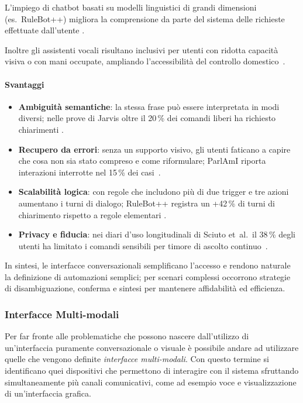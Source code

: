 L’impiego di chatbot basati su modelli linguistici di grandi dimensioni (es.\ RuleBot++) migliora la comprensione da parte del sistema delle richieste effettuate dall'utente \cite{Gallo2024Conversational}.  

Inoltre gli assistenti vocali risultano inclusivi per utenti con ridotta capacità visiva o con mani occupate, ampliando l'accessibilità del controllo domestico~\cite{Sciuto2018}.

\paragraph{Svantaggi} 
\begin{itemize}
  \item \textbf{Ambiguità semantiche}: la stessa frase può essere interpretata in modi diversi; nelle prove di Jarvis oltre il 20\,\% dei comandi liberi ha richiesto chiarimenti \cite{Lago2021}.
  \item \textbf{Recupero da errori}: senza un supporto visivo, gli utenti faticano a capire che cosa non sia stato compreso e come riformulare; ParlAmI riporta interazioni interrotte nel 15\,\% dei casi~\cite{ParlAmi2019}.
  \item \textbf{Scalabilità logica}: con regole che includono più di due trigger e tre azioni aumentano i turni di dialogo; RuleBot++ registra un +42\,\% di turni di chiarimento rispetto a regole elementari \cite{Gallo2024Conversational}.
  \item \textbf{Privacy e fiducia}: nei diari d’uso longitudinali di Sciuto et al.\ il 38\,\% degli utenti ha limitato i comandi sensibili per timore di ascolto continuo~\cite{Sciuto2018}.
\end{itemize}

In sintesi, le interfacce conversazionali semplificano l'accesso e rendono naturale la definizione di automazioni semplici; per scenari complessi occorrono strategie di disambiguazione, conferma e sintesi per mantenere affidabilità ed efficienza.



\subsubsection{Interfacce Multi-modali}
Per far fronte alle problematiche che possono nascere dall'utilizzo di un'interfaccia puramente conversazionale o visuale è possibile andare ad utilizzare quelle che vengono definite \textit{interfacce multi-modali}. Con questo termine si identificano quei dispositivi che permettono di interagire con il sistema sfruttando simultaneamente più canali comunicativi, come ad esempio voce e visualizzazione di un'interfaccia grafica. \cite{Barricelli2022MultiModal, ParlAmi2019}

